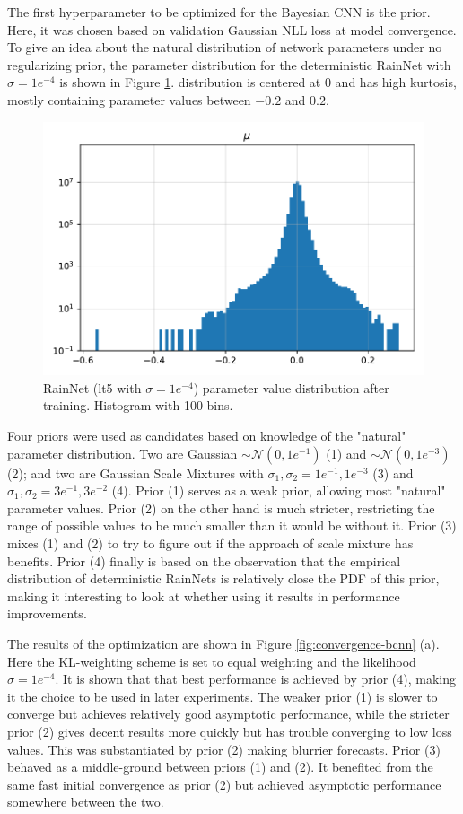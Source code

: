 \pagebreak

The first hyperparameter to be optimized for the Bayesian CNN is the prior. Here, it was chosen based on validation Gaussian NLL loss at model convergence. To give an idea about the natural distribution of network parameters under no regularizing prior, the parameter distribution for the deterministic RainNet with $\sigma = 1e^{-4}$ is shown in Figure \ref{fig:rn-weight}. distribution is centered at 0 and has high kurtosis, mostly containing parameter values between  $-0.2$ and $0.2$. 

\begin{figure}[H]
	\centering
	\includegraphics[width=0.6\linewidth]{images/weight/bcnn_rn_t1_lt5}
	\caption{RainNet (lt5 with $\sigma = 1e^{-4}$) parameter value distribution after training. Histogram with 100 bins.}
	\label{fig:rn-weight}
\end{figure}

Four priors were used as candidates based on knowledge of the "natural" parameter distribution. Two are Gaussian $\sim \mathcal{N}(0,1e^{-1})$ (1) and $\sim \mathcal{N}(0,1e^{-3})$ (2); and two are Gaussian Scale Mixtures with $\sigma_1,\sigma_2 = 1e^{-1}, 1e^{-3}$ (3) and $\sigma_1,\sigma_2 = 3e^{-1}, 3e^{-2}$ (4). Prior (1) serves as a weak prior, allowing most "natural" parameter values. Prior (2) on the other hand is much stricter, restricting the range of possible values to be much smaller than it would be without it. Prior (3) mixes (1) and (2) to try to figure out if the approach of scale mixture has benefits. Prior (4) finally is based on the observation that the empirical distribution of deterministic RainNets is relatively close the PDF of this prior, making it interesting to look at whether using it results in performance improvements.

The results of the optimization are shown in Figure \ref{fig:convergence-bcnn} (a). Here the KL-weighting scheme is set to equal weighting and the likelihood $\sigma = 1e^{-4}$. It is shown that that best performance is achieved by prior (4), making it the choice to be used in later experiments. The weaker prior (1) is slower to converge but achieves relatively good asymptotic performance, while the stricter prior (2) gives decent results more quickly but has trouble converging to low loss values. This was substantiated by prior (2) making blurrier forecasts. Prior (3) behaved as a middle-ground between priors (1) and (2). It benefited from the same fast initial convergence as prior (2) but achieved asymptotic performance somewhere between the two. 

